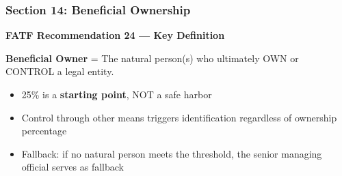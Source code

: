 \documentclass[12pt,aspectratio=169]{beamer}
\begin{document}
	\begin{frame}
		\frametitle{\fontsize{13}{15}\selectfont \textbf{Section 14: Beneficial Ownership}}
		\vspace{0.3cm}
		\begin{center}
			{\fontsize{12}{14}\selectfont \textbf{FATF Recommendation 24 — Key Definition}}
		\end{center}
		\vspace{0.2cm}
		\begin{block}{}
			\centering
			\textbf{Beneficial Owner} = The natural person(s) who ultimately OWN or CONTROL a legal entity.
			\vspace{0.1cm}
			\begin{itemize}
				\item 25\% is a \textbf{starting point}, NOT a safe harbor
				\item Control through other means triggers identification regardless of ownership percentage
				\item Fallback: if no natural person meets the threshold, the senior managing official serves as fallback
			\end{itemize}
		\end{block}
	\end{frame}
	
\end{document}
